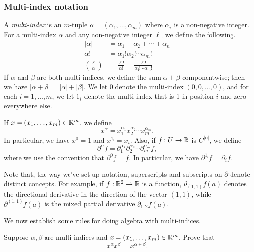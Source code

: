 \subsubsection*{Multi-index notation}

\begin{definition}  \label{multi-index}
	A \emph{multi-index} is an $m$-tuple $\alpha = (\alpha_1, \dotsc, \alpha_m)$ where $\alpha_i$ is a non-negative integer. For a multi-index $\alpha$ and any non-negative integer $\ell$, we define the following. 
	\[ \begin{aligned} |\alpha| &= \alpha_1 + \alpha_2 + \dotsb + \alpha_n \\ \alpha! &= \alpha_1! \alpha_2! \dotsb \alpha_m ! \\
	\binom{\ell}{\alpha} &= \frac{\ell!}{\alpha!} = \frac{\ell!}{\alpha_1! \dotsb \alpha_m!} \end{aligned} \]
	If $\alpha$ and $\beta$ are both multi-indices, we define the sum $\alpha + \beta$ componentwise; then we have $|\alpha + \beta| = |\alpha| + |\beta|$. We let $0$ denote the multi-index $(0, 0, \dotsc, 0)$, and for each $i = 1, \dotsc, m$, we let $1_i$ denote the multi-index that is 1 in position $i$ and zero everywhere else.
	
	If $x = (x_1, \dotsc, x_m) \in \mathbb{R}^m$, we define
	\[ x^\alpha = x_1^{\alpha_1} x_2^{\alpha_2} \dotsb x_m^{\alpha_m}. \]
	In particular, we have $x^0 = 1$ and $x^{1_i} = x_i$. 
	Also, if $f : U \to \mathbb{R}$ is $C^{|\alpha|}$, we define
	\[ \partial^\alpha f = \partial_1^{\alpha_1} \partial_2^{\alpha_2} \dotsb \partial_m^{\alpha_m} f, \]
	where we use the convention that $\partial^{0} f = f$. In particular, we have $\partial^{1_i} f = \partial_i f$. 
\end{definition}

\begin{caution}
	Note that, the way we've set up notation, superscripts and subscripts on $\partial$ denote distinct concepts. For example, if $f : \mathbb{R}^2 \to \mathbb{R}$ is a function, $\partial_{(1,1)}f(a)$ denotes the directional derivative in the direction of the vector $(1,1)$, while $\partial^{(1,1)}f(a)$ is the mixed partial derivative $\partial_{1,2}f(a)$. 
\end{caution}

We now establish some rules for doing algebra with multi-indices. 

\begin{exercise}
	Suppose $\alpha, \beta$ are multi-indices and $x = (x_1, \dotsc, x_m) \in \mathbb{R}^m$. Prove that \[ x^\alpha x^\beta = x^{\alpha + \beta}. \]
\end{exercise}

